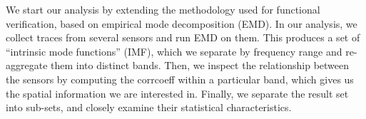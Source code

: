 



We start our analysis by extending the methodology used for functional verification, based on empirical mode decomposition (EMD).  
In our analysis, we collect traces from several sensors and run EMD on them.  This produces a set of 
``intrinsic mode functions'' (IMF), which we separate by frequency range and re-aggregate them into distinct bands.
Then, we inspect the relationship between the sensors by computing the corrcoeff within a particular band, which 
gives us the spatial information we are interested in. 
Finally, we separate the result set into sub-sets, and closely examine their statistical characteristics. 



